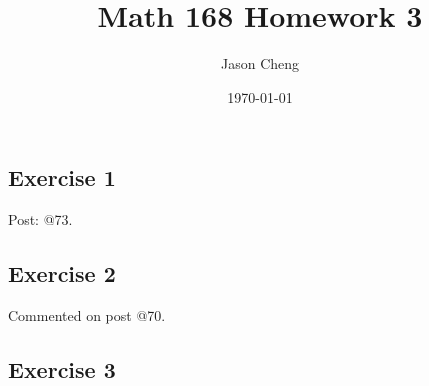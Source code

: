 \documentclass{article}
\title{Math 168 Homework 3}
\author{Jason Cheng}
\date{\today}
\begin{document}
\maketitle

\subsection*{Exercise 1}

Post: @73.

\newpage

\subsection*{Exercise 2}

Commented on post @70.

\newpage

\subsection*{Exercise 3}
\end{document}
